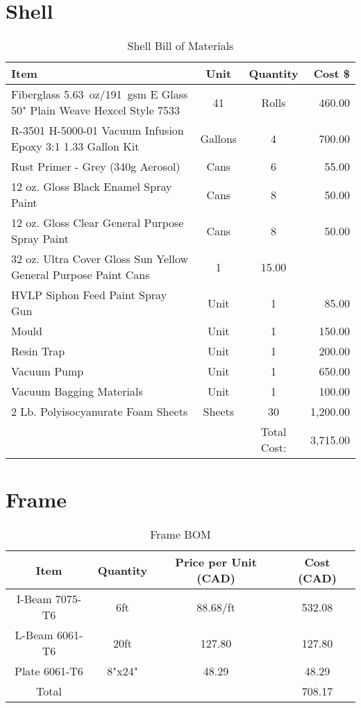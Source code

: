 \documentclass[main.tex]{subfiles}
\begin{document}
\section{Shell}
\begin{table}[H]
\centering
  \begin{tabular}{@{}l c c r@{}} \toprule
    Item & Unit & Quantity & Cost \$ \\ \midrule
    Fiberglass \SI{5.63}{oz}/\SI{191}{gsm} E Glass 50" Plain Weave Hexcel Style 7533 & 41 & Rolls & 460.00 \\
    R-3501 H-5000-01 Vacuum Infusion Epoxy 3:1 1.33 Gallon Kit & Gallons & 4 & 700.00\\
    Rust Primer - Grey (340g Aerosol) & Cans & 6 & 55.00\\
    12 oz. Gloss Black Enamel Spray Paint & Cans & 8 & 50.00\\
    12 oz. Gloss Clear General Purpose Spray Paint & Cans & 8 & 50.00\\
    32 oz. Ultra Cover Gloss Sun Yellow General Purpose Paint Cans & 1 & 15.00\\
    HVLP Siphon Feed Paint Spray Gun & Unit & 1 & 85.00 \\
    Mould & Unit & 1 & 150.00 \\
    Resin Trap & Unit & 1 & 200.00 \\
    Vacuum Pump & Unit & 1 & 650.00 \\
    Vacuum Bagging Materials & Unit & 1 & 100.00 \\
    2 Lb. Polyisocyanurate Foam Sheets & Sheets & 30 & 1,200.00 \\
    \midrule
     & & Total Cost: & 3,715.00\\
     \bottomrule
  \end{tabular}
  \caption{Shell Bill of Materials}
  \label{table:shellmoney}
\end{table}
\section{Frame}
\begin{table}[H]
    \centering 
    \begin{tabular}{cccc} 

    \toprule 

    Item & Quantity & Price per Unit (CAD) & Cost (CAD) \\ 
    \midrule 

    I-Beam 7075-T6 & 6ft & 88.68/ft & 532.08\\
    L-Beam 6061-T6 & 20ft & 127.80 & 127.80\\
    Plate 6061-T6 & 8"x24" & 48.29 & 48.29\\

\midrule
Total & & & 708.17\\
    \bottomrule
    
	\end{tabular}
    \caption{Frame BOM}
    \label{table:frame-bom}
\end{table}
\end{document}
